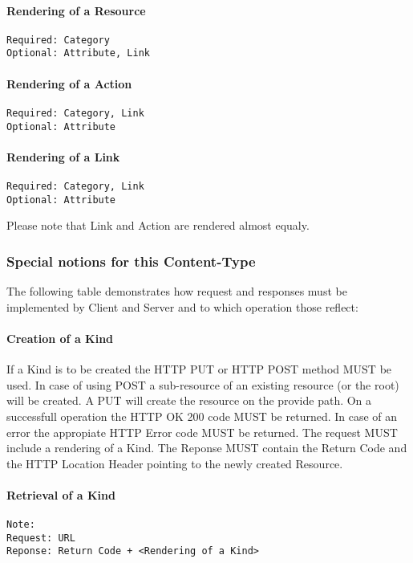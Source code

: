 \documentclass[10pt,a4paper]{article}
\begin{document}
\paragraph{Rendering of a Resource}
\begin{verbatim}
Required: Category
Optional: Attribute, Link
\end{verbatim}

\paragraph{Rendering of a Action}
\begin{verbatim}
Required: Category, Link
Optional: Attribute
\end{verbatim}

\paragraph{Rendering of a Link}
\begin{verbatim}
Required: Category, Link
Optional: Attribute
\end{verbatim}
Please note that Link and Action are rendered almost equaly.

\subsubsection{Special notions for this Content-Type}

The following table demonstrates how request and responses must be implemented by Client and Server and to which operation those reflect:


\paragraph{Creation of a Kind}
If a Kind is to be created the HTTP PUT or HTTP POST method MUST be used. In case of using POST a sub-resource of an existing resource (or the root) will be created. A PUT will create the resource on the provide path. On a successfull operation the HTTP OK 200 code MUST be returned. In case of an error the appropiate HTTP Error code MUST be returned. The request MUST include a rendering of a Kind. The Reponse MUST contain the Return Code and the HTTP Location Header pointing to the newly created Resource.

\paragraph{Retrieval of a Kind}
\begin{verbatim}
Note: 
Request: URL
Reponse: Return Code + <Rendering of a Kind>
\end{verbatim}
\end{document}
